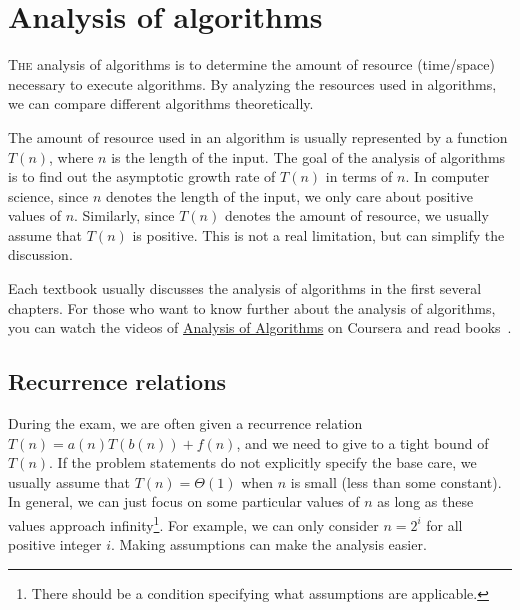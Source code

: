\chapter{Analysis of algorithms}

\lettrine{T}{he} analysis of algorithms is to determine the amount of resource (time/space) necessary to execute algorithms.
By analyzing the resources used in algorithms, we can compare different algorithms theoretically.

The amount of resource used in an algorithm is usually represented by a function $T(n)$, where $n$ is the length of the input.
The goal of the analysis of algorithms is to find out the asymptotic growth rate of $T(n)$ in terms of $n$.
In computer science, since $n$ denotes the length of the input, we only care about positive values of $n$.
Similarly, since $T(n)$ denotes the amount of resource, we usually assume that $T(n)$ is positive.
This is not a real limitation, but can simplify the discussion.

Each textbook usually discusses the analysis of algorithms in the first several chapters.
For those who want to know further about the analysis of algorithms, you can watch the videos of \href{https://www.coursera.org/course/aofa}{Analysis of Algorithms} on Coursera and read books~\cite{Graham1994,Purdom2004,Sedgewick2013}.

\section{Recurrence relations}
During the exam, we are often given a recurrence relation $T(n) = a(n)T(b(n)) + f(n)$, and we need to give to a tight bound of $T(n)$. If the problem statements do not explicitly specify the base care, we usually assume that $T(n) = \Theta(1)$ when $n$ is small (less than some constant). In general, we can just focus on some particular values of $n$ as long as these values approach infinity\footnote{There should be a condition specifying what assumptions are applicable.}. For example, we can only consider $n = 2^i$ for all positive integer $i$. 
Making assumptions can make the analysis easier.

